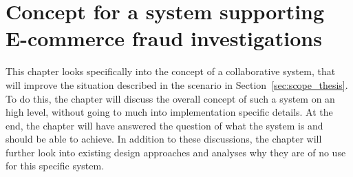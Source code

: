 
\chapter{Concept for a system supporting \gls{E-commerce} fraud investigations} %
\label{cha:system_concept}

This chapter looks specifically into the concept of a collaborative system, that will improve the situation described in the scenario in Section~\ref{sec:scope_thesis}. To do this, the chapter will discuss the overall concept of such a system on an high level, without going to much into implementation specific details. At the end, the chapter will have answered the question of what the system is and should be able to achieve. In addition to these discussions, the chapter will further look into existing design approaches and analyses why they are of no use for this specific system.











